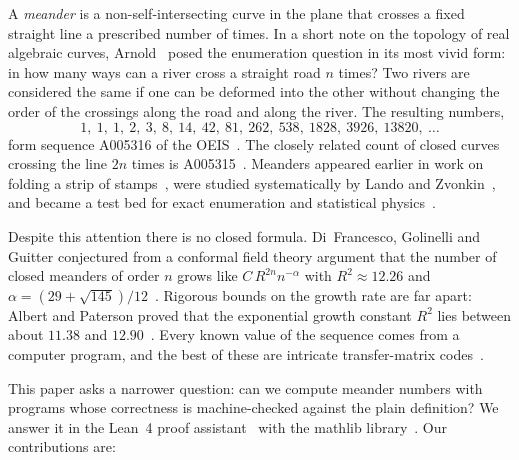 \documentclass[11pt]{amsart}
\theoremstyle{definition}
\theoremstyle{remark}
\begin{document}
A \emph{meander} is a non-self-intersecting curve in the plane that crosses a fixed straight
line a prescribed number of times. In a short note on the topology of real algebraic curves,
Arnold~\cite{arnold88} posed the enumeration question in its most vivid form: in how many ways
can a river cross a straight road $n$ times? Two rivers are considered the same if one can be
deformed into the other without changing the order of the crossings along the road and along
the river. The resulting numbers,
\[
  1,\ 1,\ 1,\ 2,\ 3,\ 8,\ 14,\ 42,\ 81,\ 262,\ 538,\ 1828,\ 3926,\ 13820,\ \dots
\]
form sequence A005316 of the OEIS~\cite{oeis-a005316}. The closely related count of closed
curves crossing the line $2n$ times is A005315~\cite{oeis-a005315}. Meanders appeared earlier in
work on folding a strip of stamps~\cite{touchard50}, were studied systematically by Lando and
Zvonkin~\cite{lando-zvonkin}, and became a test bed for exact enumeration and statistical
physics~\cite{dgg97,dgg00,jensen00}.

Despite this attention there is no closed formula. Di~Francesco, Golinelli and Guitter
conjectured from a conformal field theory argument that the number of closed meanders of order
$n$ grows like $C\,R^{2n} n^{-\alpha}$ with $R^2 \approx 12.26$ and
$\alpha = (29+\sqrt{145})/12$~\cite{dgg00}. Rigorous bounds on the growth rate are far apart:
Albert and Paterson proved that the exponential growth constant $R^2$ lies between about
$11.38$ and $12.90$~\cite{albert-paterson}. Every known value of the sequence comes from a
computer program, and the best of these are intricate transfer-matrix
codes~\cite{jensen00}.

This paper asks a narrower question: can we compute meander numbers with programs whose
correctness is machine-checked against the plain definition? We answer it in the Lean~4 proof
assistant~\cite{lean4} with the mathlib library~\cite{mathlib}. Our contributions are:
\end{document}
